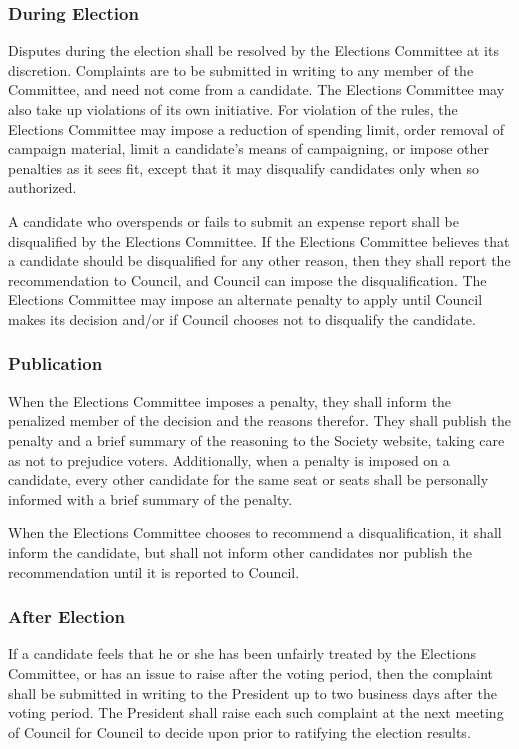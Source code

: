 \subsubsection{During Election}
Disputes during the election shall be resolved by the Elections Committee at its discretion.
Complaints are to be submitted in writing to any member of the Committee, and need not come from a candidate.
The Elections Committee may also take up violations of its own initiative.
For violation of the rules, the Elections Committee may impose a reduction of spending limit, order removal of campaign material, limit a candidate's means of campaigning, or impose other penalties as it sees fit, except that it may disqualify candidates only when so authorized.

A candidate who overspends or fails to submit an expense report shall be disqualified by the Elections Committee.
If the Elections Committee believes that a candidate should be disqualified for any other reason, then they shall report the recommendation to Council, and Council can impose the disqualification.
The Elections Committee may impose an alternate penalty to apply until Council makes its decision and/or if Council chooses not to disqualify the candidate.

\subsubsection{Publication}
When the Elections Committee imposes a penalty, they shall inform the penalized member of the decision and the reasons therefor.
They shall publish the penalty and a brief summary of the reasoning to the Society website, taking care as not to prejudice voters.
Additionally, when a penalty is imposed on a candidate, every other candidate for the same seat or seats shall be personally informed with a brief summary of the penalty.

When the Elections Committee chooses to recommend a disqualification, it shall inform the candidate, but shall not inform other candidates nor publish the recommendation until it is reported to Council.

\subsubsection{After Election}
If a candidate feels that he or she has been unfairly treated by the Elections Committee, or has an issue to raise after the voting period, then the complaint shall be submitted in writing to the President up to two business days after the voting period.
The President shall raise each such complaint at the next meeting of Council for Council to decide upon prior to ratifying the election results.

